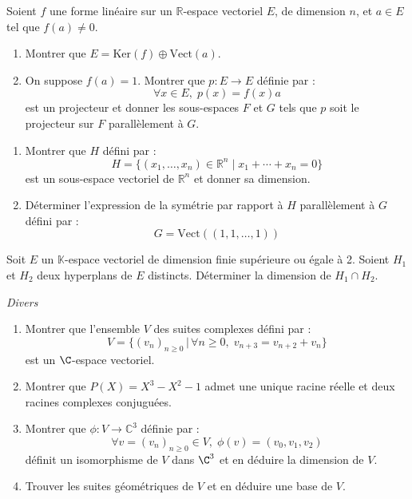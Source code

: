 \documentclass[a4paper,10pt]{report}
\begin{document}
\begin{Exercice}{} Soient $f$ une forme linéaire sur un $\mathbb{R}$-espace vectoriel $E$, de dimension $n$, et $a\in E$ tel que $f(a)\neq 0$.
\begin{enumerate}
\item Montrer que $E=\textrm{Ker}(f)\oplus\textrm{Vect}(a)$.
\item On suppose $f(a)=1$. Montrer que $p : E \rightarrow E$ définie par :
$$ \forall x \in E, \; p(x) = f(x) a $$
est un projecteur et donner les sous-espaces $F$ et $G$ tels que $p$ soit le projecteur sur $F$ parallèlement à $G$.
\end{enumerate}
\end{Exercice}


\begin{Exercice}{} 
\begin{enumerate}
\item Montrer que $H$ défini par :
$$ H = \lbrace (x_1, \ldots, x_n)\in \mathbb{R}^n \; \vert \;    x_1 + \cdots + x_n = 0 \rbrace$$
est un sous-espace vectoriel de $\mathbb{R}^n$ et donner sa dimension.
\item Déterminer l'expression de la symétrie par rapport à $H$ parallèlement à $G$ défini par :
$$ G = \textrm{Vect}((1,1, \ldots, 1))$$
\end{enumerate}
\end{Exercice}



\begin{Exercice}{} Soit $E$ un $\mathbb{K}$-espace vectoriel de dimension finie supérieure ou égale à 2. Soient $H_1$ et $H_2$ deux hyperplans de $E$ distincts. Déterminer la dimension de $H_1 \cap H_2$.
\end{Exercice}

\newpage

\begin{center}
\textit{{ {\large Divers}}}
\end{center}

\medskip

\begin{Exercice}{} \begin{enumerate}
 \item Montrer que l'ensemble $V$ des suites complexes défini par :
 $$ V = \lbrace (v_n)_{n \geq 0} \, \vert \, \forall n \geq 0, \; v_{n+3}=v_{n+2}+v_n \rbrace$$
est un $\C$-espace vectoriel.
 \item Montrer que $P(X)=X^3-X^2-1$ admet une unique racine réelle et deux racines complexes conjuguées.
 \item Montrer que $\phi : V \rightarrow \mathbb{C}^3$ définie par :
 $$ \forall v=(v_n)_{n \geq 0} \in V, \;\phi(v)=(v_0,v_1,v_2)$$
  définit un isomorphisme de $V$ dans $\C^3$ et en déduire la dimension de $V$.
 \item Trouver les suites géométriques de $V$ et en déduire une base de $V$.
\end{enumerate}
\end{Exercice}
\end{document}
